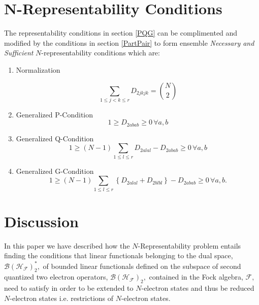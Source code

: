 \documentclass[aps,preprint]{revtex4}%
\begin{document}
\section{N-Representability Conditions \label{NRepCon}}

The representability conditions in section \ref{PQG} can be complimented and
modified by the conditions in section \ref{PartPair} to form ensemble
\emph{Necessary and Sufficient }$N$-representability conditions which are:

\begin{enumerate}
\item Normalization%

\begin{equation}
\sum_{1\leq j<k\leq r}D_{2jkjk}=\binom{N}{2}%
\end{equation}


\item Generalized P-Condition%
\begin{equation}
1\geq D_{2abab}\geq0\,\forall a,b
\end{equation}


\item Generalized Q-Condition%
\begin{equation}
1\geq\left(  N-1\right)  \sum_{1\leq l\leq r}D_{2alal}-D_{2abab}\geq0\,\forall
a,b
\end{equation}


\item Generalized G-Condition%
\begin{equation}
1\geq\left(  N-1\right)  \sum_{1\leq l\leq r}\left\{  D_{2alal}+D_{2blbl}%
\right\}  -D_{2abab}\geq0\,\forall a,b.
\end{equation}

\end{enumerate}

\section{Discussion \label{Discussion}}

In this paper we have described how the $N$-Representability problem entails
finding the conditions that linear functionals belonging to the dual space,
$\mathcal{B}\left(  \mathcal{H}_{\mathcal{F}}\right)  _{2}^{\ast},$ of bounded
linear functionals defined on the subspace of second quantized two electron
operators, $\mathcal{B}\left(  \mathcal{H}_{\mathcal{F}}\right)  _{2},$
contained in the Fock algebra, $\mathcal{F},$ need to satisfy in order to be
extended to $N$-electron states and thus be reduced $N$-electron states i.e.
restrictions of $N$-electron states.
\end{document}
